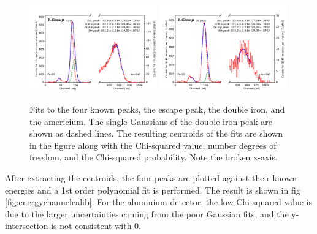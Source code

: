 \begin{figure}[htb!]
  \includegraphics[width=0.49\textwidth,page=1]{graphics/channelfits.pdf}
  \includegraphics[width=0.49\textwidth,page=1]{graphics/aluchannelfits.pdf}
  \caption{Fits to the four known peaks, the escape peak, the double iron, and the americium. The single Gaussians of the double iron peak are shown as dashed lines. The resulting centroids of the fits are shown in the figure along with the Chi-squared value, number degrees of freedom, and the Chi-squared probability. Note the broken x-axis.}
  \label{fig:channelfits}
\end{figure}

After extracting the centroids, the four peaks are plotted against their known energies and a 1st order polynomial fit is performed. The result is shown in fig \ref{fig:energychannelcalib}. For the aluminium detector, the low Chi-squared value is due to the larger uncertainties coming from the poor Gaussian fits, and the y-intersection is not consistent with 0.


